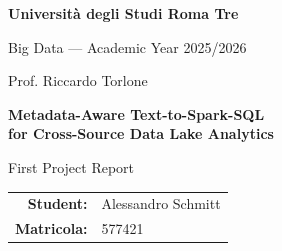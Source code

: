 \documentclass[11pt,a4paper]{article}
\begin{document}

\begin{titlepage}
\centering

\vspace*{1.2cm}

{\Large\textbf{Università degli Studi Roma Tre}\par}

\vspace{0.45cm}

{\large
Big Data --- Academic Year 2025/2026\par
}

\vspace{0.15cm}

{\large
Prof. Riccardo Torlone\par
}

\vfill

{\LARGE\bfseries
Metadata-Aware Text-to-Spark-SQL\\[0.2cm]
for Cross-Source Data Lake Analytics
\par}

\vspace{0.65cm}

{\Large First Project Report\par}

\vfill

\begin{tabular}{rl}
\textbf{Student:} & Alessandro Schmitt \\[0.15cm]
\textbf{Matricola:} & 577421
\end{tabular}

\vspace{1.2cm}

\end{titlepage}



\end{document}

